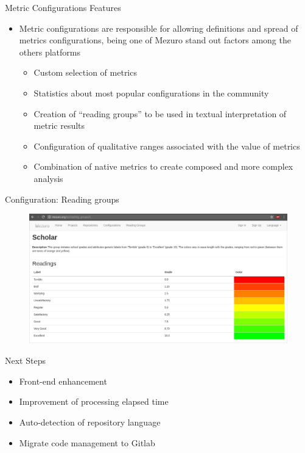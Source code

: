 \begin{block}{Metric Configurations Features}
    \begin{itemize}
        \item Metric configurations are responsible for allowing
            definitions and spread of metrics configurations, being
            one of Mezuro stand out factors among the others platforms
            \begin{itemize}
                \item Custom selection of metrics
                \item Statistics about most popular configurations in the
                    community
                \item Creation of ``reading groups'' to be used in textual
                    interpretation of metric results
                \item Configuration of qualitative ranges associated with the
                    value of metrics
                \item Combination of native metrics to create composed and more
                    complex analysis
            \end{itemize}
    \end{itemize}
\end{block}

\begin{block}{Configuration: Reading groups}
    \begin{figure}
        \begin{center}
            \includegraphics[width=\textwidth]{figures/ReadingGroup.png}
            \label{fig:feature1}
        \end{center}
    \end{figure}
\end{block}

\begin{block}{Next Steps}
    \begin{itemize}
        \item Front-end enhancement
        \item Improvement of processing elapsed time
        \item Auto-detection of repository language
        \item Migrate code management to Gitlab
    \end{itemize}
\end{block}
